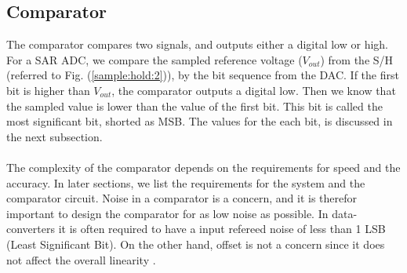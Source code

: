 \documentclass[english, 12pt, a4paper]{ifimaster}
\begin{document}
\subsection{Comparator}
The comparator compares two signals, and outputs either a digital low or high. For a SAR ADC, we compare the sampled reference voltage (\(V_{out}\)) from the S/H (referred to 
Fig. (\ref{sample:hold:2})), by the bit sequence from the DAC. 
If the first bit is higher than \(V_{out}\), the comparator outputs a digital low. Then we know that the sampled value is lower than the value of the first bit. This bit is called the most 
significant bit, shorted as MSB. The values for the each bit, is discussed in the next subsection.\\
\\
The complexity of the comparator depends on the requirements for speed and the accuracy. In later sections, we list the requirements for the system and the comparator circuit. Noise in a comparator is a 
concern, and it is therefor important to design the comparator for as low noise as possible. In data-converters it is often required to have a input refereed noise of less than 1 LSB 
(Least Significant Bit). On the other hand, offset is not a concern since it does not affect the overall linearity \cite{sar-adc-concept}. 
\end{document}
